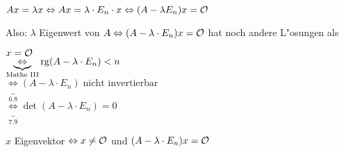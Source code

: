 $Ax = \lambda x \Leftrightarrow Ax = \lambda \cdot E_n \cdot x \Leftrightarrow (A - \lambda E_n) x = \mathcal{O}$

Also: $\lambda$ Eigenwert von $A \Leftrightarrow (A- \lambda \cdot E_n)x = \mathcal{O}$ hat noch andere L"osungen als 

$x = \mathcal{O}$\\
$\underbrace{\Leftrightarrow}_{\text{Mathe III}} \mathrm{ rg }(A-\lambda \cdot E_n) < n$\\
$\underbrace{\Leftrightarrow}_{6.8}(A-\lambda \cdot E_n) \; \text{nicht invertierbar}$\\
$\underbrace{\Leftrightarrow}_{7.9}\det(A-\lambda \cdot E_n) = 0$

$x$ Eigenvektor $\Leftrightarrow x \neq \mathcal{O}$ und $(A- \lambda \cdot E_n) x = \mathcal{O}$


